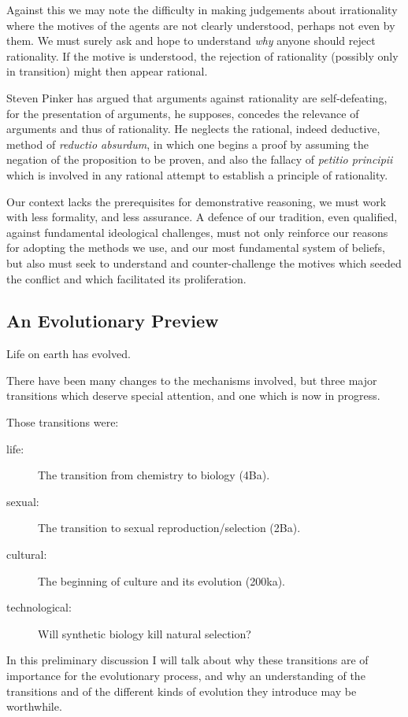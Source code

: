\documentclass[10pt,titlepage]{book}
\begin{document}
Against this we may note the difficulty in making judgements about irrationality where the motives of the agents are not clearly understood, perhaps not even by them.
We must surely ask and hope to understand \emph{why} anyone should reject rationality.
If the motive is understood, the rejection of rationality (possibly only in transition) might then appear rational.

Steven Pinker has argued that arguments against rationality are self-defeating, for the presentation of arguments, he supposes, concedes the relevance of arguments and thus of rationality.
He neglects the rational, indeed deductive, method of \emph{reductio absurdum}, in which one begins a proof by assuming the negation of the proposition to be proven, and also the fallacy of \emph{petitio principii} which is involved in any rational attempt to establish a principle of rationality.

Our context lacks the prerequisites for demonstrative reasoning, we must work with less formality, and less assurance.
A defence of our tradition, even qualified, against fundamental ideological challenges, must not only reinforce our reasons for adopting the methods we use, and our most fundamental system of beliefs, but also must seek to understand and counter-challenge the motives which seeded the conflict and which facilitated its proliferation.

\subsection{An Evolutionary Preview}

Life on earth has evolved.

There have been many changes to the mechanisms involved, but three major transitions which deserve special attention, and one which is now in progress.

Those transitions were:

\begin{description}
\item[life:] The transition from chemistry to biology (4Ba).
\item[sexual:] The transition to sexual reproduction/selection (2Ba).
\item[cultural:] The beginning of culture and its evolution (200ka).
\item[technological:] Will synthetic biology kill natural selection?
\end{description}

In this preliminary discussion I will talk about why these transitions are of importance for the evolutionary process, and why an understanding of the transitions and of the different kinds of evolution they introduce may be worthwhile.
\end{document}
